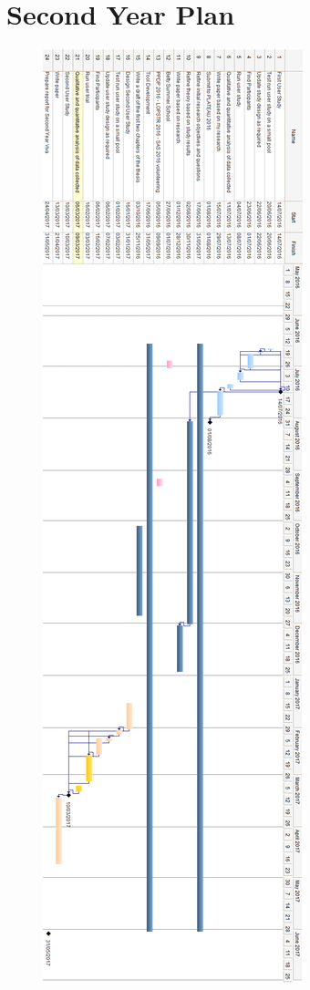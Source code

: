 \documentclass{mproj}
\begin{document}
\section{Second Year Plan}
\label{appendix:gantt}
\begin{figure}[h!]
    \includegraphics[height=0.9\vsize, width=1.1\hsize]{SecondYear.png}
\end{figure}
\end{document}
